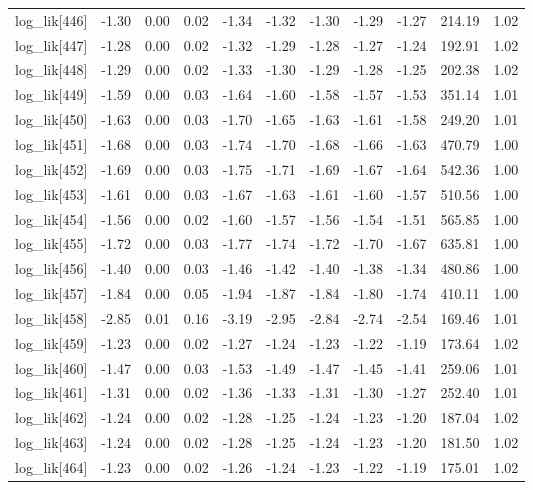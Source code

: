 \begin{table}[ht]
\begin{tabular}{rrrrrrrrrrr}
  log\_lik[446] & -1.30 & 0.00 & 0.02 & -1.34 & -1.32 & -1.30 & -1.29 & -1.27 & 214.19 & 1.02 \\ 
  log\_lik[447] & -1.28 & 0.00 & 0.02 & -1.32 & -1.29 & -1.28 & -1.27 & -1.24 & 192.91 & 1.02 \\ 
  log\_lik[448] & -1.29 & 0.00 & 0.02 & -1.33 & -1.30 & -1.29 & -1.28 & -1.25 & 202.38 & 1.02 \\ 
  log\_lik[449] & -1.59 & 0.00 & 0.03 & -1.64 & -1.60 & -1.58 & -1.57 & -1.53 & 351.14 & 1.01 \\ 
  log\_lik[450] & -1.63 & 0.00 & 0.03 & -1.70 & -1.65 & -1.63 & -1.61 & -1.58 & 249.20 & 1.01 \\ 
  log\_lik[451] & -1.68 & 0.00 & 0.03 & -1.74 & -1.70 & -1.68 & -1.66 & -1.63 & 470.79 & 1.00 \\ 
  log\_lik[452] & -1.69 & 0.00 & 0.03 & -1.75 & -1.71 & -1.69 & -1.67 & -1.64 & 542.36 & 1.00 \\ 
  log\_lik[453] & -1.61 & 0.00 & 0.03 & -1.67 & -1.63 & -1.61 & -1.60 & -1.57 & 510.56 & 1.00 \\ 
  log\_lik[454] & -1.56 & 0.00 & 0.02 & -1.60 & -1.57 & -1.56 & -1.54 & -1.51 & 565.85 & 1.00 \\ 
  log\_lik[455] & -1.72 & 0.00 & 0.03 & -1.77 & -1.74 & -1.72 & -1.70 & -1.67 & 635.81 & 1.00 \\ 
  log\_lik[456] & -1.40 & 0.00 & 0.03 & -1.46 & -1.42 & -1.40 & -1.38 & -1.34 & 480.86 & 1.00 \\ 
  log\_lik[457] & -1.84 & 0.00 & 0.05 & -1.94 & -1.87 & -1.84 & -1.80 & -1.74 & 410.11 & 1.00 \\ 
  log\_lik[458] & -2.85 & 0.01 & 0.16 & -3.19 & -2.95 & -2.84 & -2.74 & -2.54 & 169.46 & 1.01 \\ 
  log\_lik[459] & -1.23 & 0.00 & 0.02 & -1.27 & -1.24 & -1.23 & -1.22 & -1.19 & 173.64 & 1.02 \\ 
  log\_lik[460] & -1.47 & 0.00 & 0.03 & -1.53 & -1.49 & -1.47 & -1.45 & -1.41 & 259.06 & 1.01 \\ 
  log\_lik[461] & -1.31 & 0.00 & 0.02 & -1.36 & -1.33 & -1.31 & -1.30 & -1.27 & 252.40 & 1.01 \\ 
  log\_lik[462] & -1.24 & 0.00 & 0.02 & -1.28 & -1.25 & -1.24 & -1.23 & -1.20 & 187.04 & 1.02 \\ 
  log\_lik[463] & -1.24 & 0.00 & 0.02 & -1.28 & -1.25 & -1.24 & -1.23 & -1.20 & 181.50 & 1.02 \\ 
  log\_lik[464] & -1.23 & 0.00 & 0.02 & -1.26 & -1.24 & -1.23 & -1.22 & -1.19 & 175.01 & 1.02 \\ 

\end{tabular}
\end{table}
